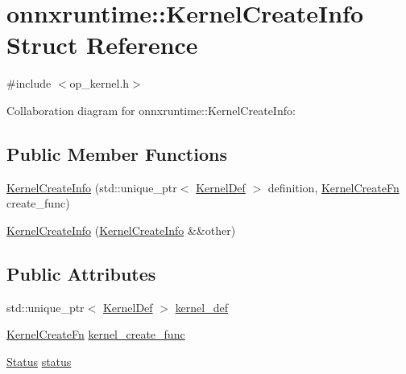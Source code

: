 \hypertarget{structonnxruntime_1_1KernelCreateInfo}{}\section{onnxruntime\+:\+:Kernel\+Create\+Info Struct Reference}
\label{structonnxruntime_1_1KernelCreateInfo}


{\ttfamily \#include $<$op\+\_\+kernel.\+h$>$}



Collaboration diagram for onnxruntime\+:\+:Kernel\+Create\+Info\+:
\subsection*{Public Member Functions}
\begin{DoxyCompactItemize}
\item 
\mbox{\hyperlink{structonnxruntime_1_1KernelCreateInfo_a0e38874795b76fbdef0606c051f43fa7}{Kernel\+Create\+Info}} (std\+::unique\+\_\+ptr$<$ \mbox{\hyperlink{classonnxruntime_1_1KernelDef}{Kernel\+Def}} $>$ definition, \mbox{\hyperlink{namespaceonnxruntime_a2e23731e78afbe4e5e15a18493162335}{Kernel\+Create\+Fn}} create\+\_\+func)
\item 
\mbox{\hyperlink{structonnxruntime_1_1KernelCreateInfo_adecf1b55966f673e60599b2c2a8b50bb}{Kernel\+Create\+Info}} (\mbox{\hyperlink{structonnxruntime_1_1KernelCreateInfo}{Kernel\+Create\+Info}} \&\&other)
\end{DoxyCompactItemize}
\subsection*{Public Attributes}
\begin{DoxyCompactItemize}
\item 
std\+::unique\+\_\+ptr$<$ \mbox{\hyperlink{classonnxruntime_1_1KernelDef}{Kernel\+Def}} $>$ \mbox{\hyperlink{structonnxruntime_1_1KernelCreateInfo_aa55b48d00c17feb66006a37b8deeb38d}{kernel\+\_\+def}}
\item 
\mbox{\hyperlink{namespaceonnxruntime_a2e23731e78afbe4e5e15a18493162335}{Kernel\+Create\+Fn}} \mbox{\hyperlink{structonnxruntime_1_1KernelCreateInfo_a6699cb37c649a8869712fdba8357f76a}{kernel\+\_\+create\+\_\+func}}
\item 
\mbox{\hyperlink{classonnxruntime_1_1common_1_1Status}{Status}} \mbox{\hyperlink{structonnxruntime_1_1KernelCreateInfo_a49d9ac03157b8825c33e7bb2bd6e1f35}{status}}
\end{DoxyCompactItemize}


